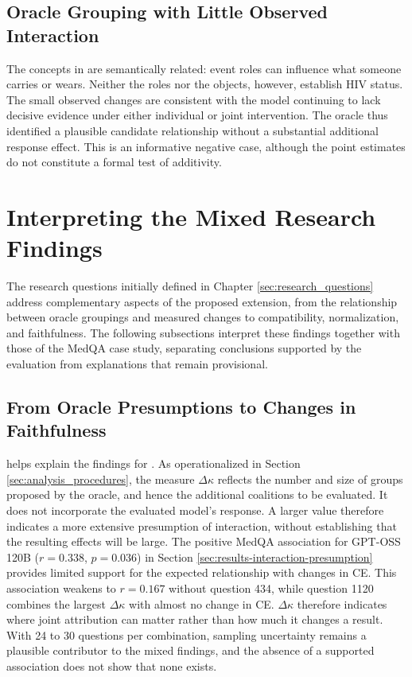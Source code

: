 \subsection{Oracle Grouping with Little Observed Interaction}

The concepts in  are semantically related: event roles can influence what someone carries or wears. Neither the roles nor the objects, however, establish HIV status. The small observed changes are consistent with the model continuing to lack decisive evidence under either individual or joint intervention. The oracle thus identified a plausible candidate relationship without a substantial additional response effect. This is an informative negative case, although the point estimates do not constitute a formal test of additivity.

\section{Interpreting the Mixed Research Findings}
\label{sec:mixed_research_findings}

The research questions initially defined in Chapter \ref{sec:research_questions} address complementary aspects of the proposed extension, from the relationship between oracle groupings and measured changes to compatibility, normalization, and faithfulness. The following subsections interpret these findings together with those of the MedQA case study, separating conclusions supported by the evaluation from explanations that remain provisional.

\subsection{From Oracle Presumptions to Changes in Faithfulness}

 helps explain the findings for . As operationalized in Section \ref{sec:analysis_procedures}, the measure $\Delta\kappa$ reflects the number and size of groups proposed by the oracle, and hence the additional coalitions to be evaluated. It does not incorporate the evaluated model's response. A larger value therefore indicates a more extensive presumption of interaction, without establishing that the resulting effects will be large. The positive MedQA association for GPT-OSS 120B ($r=0.338$, $p=0.036$) in Section \ref{sec:results-interaction-presumption} provides limited support for the expected relationship with changes in CE. This association weakens to $r=0.167$ without question 434, while question 1120 combines the largest $\Delta\kappa$ with almost no change in CE. $\Delta\kappa$ therefore indicates where joint attribution can matter rather than how much it changes a result. With 24 to 30 questions per combination, sampling uncertainty remains a plausible contributor to the mixed findings, and the absence of a supported association does not show that none exists.

